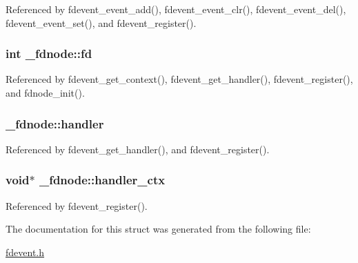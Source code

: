 Referenced by fdevent\-\_\-event\-\_\-add(), fdevent\-\_\-event\-\_\-clr(), fdevent\-\_\-event\-\_\-del(), fdevent\-\_\-event\-\_\-set(), and fdevent\-\_\-register().

\hypertarget{struct__fdnode_a00a11f60bb26e73cb7fb6e84bb4ffbc4}{
\subsubsection[{fd}]{\setlength{\rightskip}{0pt plus 5cm}int \-\_\-fdnode\-::fd}}\label{struct__fdnode_a00a11f60bb26e73cb7fb6e84bb4ffbc4}


Referenced by fdevent\-\_\-get\-\_\-context(), fdevent\-\_\-get\-\_\-handler(), fdevent\-\_\-register(), and fdnode\-\_\-init().

\hypertarget{struct__fdnode_a197ee75ecdf4018d2b6eec823dc67ff4}{
\subsubsection[{handler}]{ \-\_\-fdnode\-::handler}}\label{struct__fdnode_a197ee75ecdf4018d2b6eec823dc67ff4}


Referenced by fdevent\-\_\-get\-\_\-handler(), and fdevent\-\_\-register().

\hypertarget{struct__fdnode_a2f6ad4b40f7d71ff6dd0e9521c09447e}{
\subsubsection[{handler\-\_\-ctx}]{\setlength{\rightskip}{0pt plus 5cm}void$\ast$ \-\_\-fdnode\-::handler\-\_\-ctx}}\label{struct__fdnode_a2f6ad4b40f7d71ff6dd0e9521c09447e}


Referenced by fdevent\-\_\-register().



The documentation for this struct was generated from the following file\-:\begin{DoxyCompactItemize}
\item 
\hyperlink{fdevent_8h}{fdevent.\-h}\end{DoxyCompactItemize}
